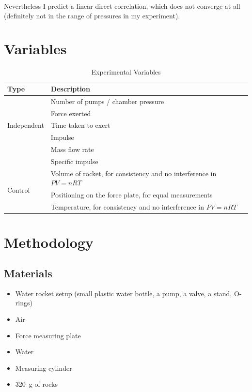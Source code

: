 \documentclass[12pt,a4paper]{article}
\begin{document}
Nevertheless I predict a linear direct correlation, which does not converge at all (definitely not in the range of pressures in my experiment).

\section{Variables}

\begin{table}[H]
\centering
\caption{Experimental Variables}
\begin{tabular}{p{3cm}p{8cm}}
\toprule
\textbf{Type} & \textbf{Description} \\
\midrule
\multirow{5}{*}{Independent} & Number of pumps / chamber pressure \\
\midrule
\multirow{5}{*}{Dependent} & Force exerted \\
& Time taken to exert \\
& Impulse \\
& Mass flow rate \\
& Specific impulse \\
\midrule
\multirow{3}{*}{Control} & Volume of rocket, for consistency and no interference in $PV = nRT$ \\
& Positioning on the force plate, for equal measurements \\
& Temperature, for consistency and no interference in $PV = nRT$ \\
\bottomrule
\end{tabular}
\end{table}

\section{Methodology}

\subsection{Materials}
\begin{itemize}
    \item Water rocket setup (small plastic water bottle, a pump, a valve, a stand, O-rings)
    \item Air
    \item Force measuring plate
    \item Water
    \item Measuring cylinder
    \item \SI{320}{\gram} of rocks
\end{itemize}
\end{document}
